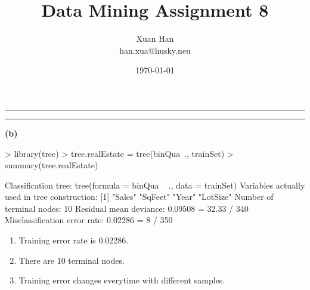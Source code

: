 \documentclass[a4paper]{article}
\makeatletter
\newcommand{\question}[2] {\vspace{.25in} \hrule\vspace{0.5em}
\noindent{\bf #1: #2} \vspace{0.5em}
\hrule \vspace{.10in}}
\renewcommand{\part}[1] {\vspace{.10in} {\bf (#1)}}
\newcommand{\myname}{Xuan Han}
\newcommand{\myhusky}{han.xua@husky.neu}
\newcommand{\myhwnum}{8}
\makeatother
\begin{document}


\title{Data Mining Assignment \myhwnum}
\author{\myname \\
        \myhusky}
\date{\today}
\maketitle

\thispagestyle{plain}

\begin{Schunk}
\end{Schunk}

\question{1}{Tree}
\part{b}
\begin{Schunk}
\begin{Sinput}
> library(tree)
> tree.realEstate = tree(binQua~., trainSet)
> summary(tree.realEstate)
\end{Sinput}
\begin{Soutput}
Classification tree:
tree(formula = binQua ~ ., data = trainSet)
Variables actually used in tree construction:
[1] "Sales"   "SqFeet"  "Year"    "LotSize"
Number of terminal nodes:  10 
Residual mean deviance:  0.09508 = 32.33 / 340 
Misclassification error rate: 0.02286 = 8 / 350 
\end{Soutput}
\end{Schunk}
{\color{red}
\begin{enumerate}
\item Training error rate is 0.02286.
\item There are 10 terminal nodes.
\item Training error changes everytime with different samples.
\end{enumerate}
}
\end{document}
